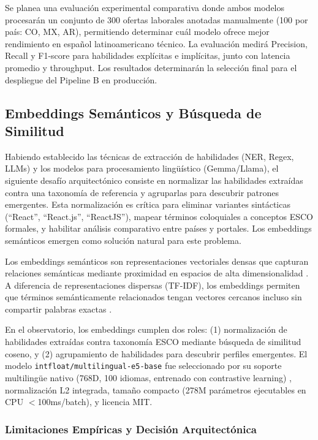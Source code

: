 Se planea una evaluación experimental comparativa donde ambos modelos procesarán un conjunto de 300 ofertas laborales anotadas manualmente (100 por país: CO, MX, AR), permitiendo determinar cuál modelo ofrece mejor rendimiento en español latinoamericano técnico. La evaluación medirá Precision, Recall y F1-score para habilidades explícitas e implícitas, junto con latencia promedio y throughput. Los resultados determinarán la selección final para el despliegue del Pipeline B en producción.

\subsection{Embeddings Semánticos y Búsqueda de Similitud}

Habiendo establecido las técnicas de extracción de habilidades (NER, Regex, LLMs) y los modelos para procesamiento lingüístico (Gemma/Llama), el siguiente desafío arquitectónico consiste en normalizar las habilidades extraídas contra una taxonomía de referencia y agruparlas para descubrir patrones emergentes. Esta normalización es crítica para eliminar variantes sintácticas (``React'', ``React.js'', ``ReactJS''), mapear términos coloquiales a conceptos ESCO formales, y habilitar análisis comparativo entre países y portales. Los embeddings semánticos emergen como solución natural para este problema.

Los embeddings semánticos son representaciones vectoriales densas que capturan relaciones semánticas mediante proximidad en espacios de alta dimensionalidad \cite{mikolov2013}. A diferencia de representaciones dispersas (TF-IDF), los embeddings permiten que términos semánticamente relacionados tengan vectores cercanos incluso sin compartir palabras exactas \cite{reimers2019}.

En el observatorio, los embeddings cumplen dos roles: (1) normalización de habilidades extraídas contra taxonomía ESCO mediante búsqueda de similitud coseno, y (2) agrupamiento de habilidades para descubrir perfiles emergentes. El modelo \texttt{intfloat/multilingual-e5-base} fue seleccionado por su soporte multilingüe nativo (768D, 100 idiomas, entrenado con contrastive learning) \cite{wang2024}, normalización L2 integrada, tamaño compacto (278M parámetros ejecutables en CPU $<$100ms/batch), y licencia MIT.

\subsubsection{Limitaciones Empíricas y Decisión Arquitectónica}

